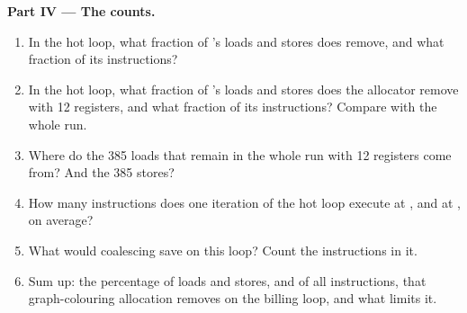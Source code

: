 \begin{problem}
\medskip\noindent\textbf{Part IV --- The counts.}
\begin{enumerate}[resume]
\item In the hot loop, what fraction of 's loads and stores does  remove, and what fraction of its instructions?
\item In the hot loop, what fraction of 's loads and stores does the allocator remove with 12 registers, and what fraction of its instructions? Compare with the whole run.
\item Where do the 385 loads that remain in the whole run with 12 registers come from? And the 385 stores?
\item How many instructions does one iteration of the hot loop execute at , and at , on average?
\item What would coalescing save on this loop? Count the  instructions in it.
\item Sum up: the percentage of loads and stores, and of all instructions, that graph-colouring allocation removes on the billing loop, and what limits it.
\end{enumerate}
\end{problem}
